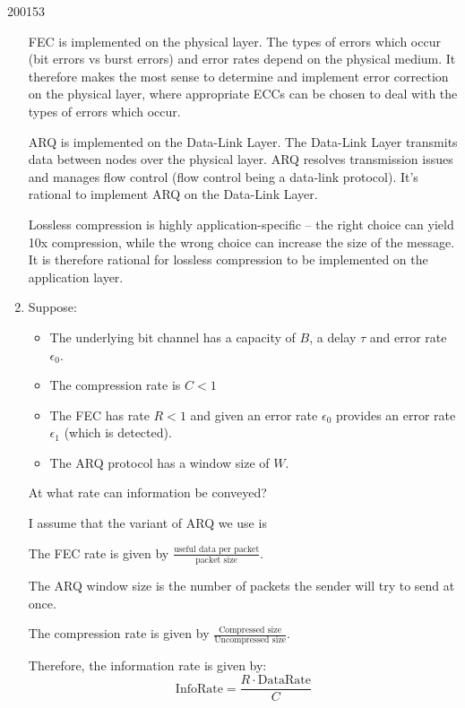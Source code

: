 \documentclass[10pt,\jkfside,a4paper]{article}
\begin{document}
\begin{examquestion}{2001}{5}{3}
\begin{enumerate}
FEC is implemented on the physical layer. The types of errors which occur
(bit errors vs burst errors) and error rates depend on the physical medium.
It therefore makes the most sense to determine and implement error
correction on the physical layer, where appropriate ECCs can be chosen to
deal with the types of errors which occur.

ARQ is implemented on the Data-Link Layer. The Data-Link Layer transmits
data between nodes over the physical layer. ARQ resolves transmission issues
and manages flow control (flow control being a data-link protocol). It's
rational to implement ARQ on the Data-Link Layer.

Lossless compression is highly application-specific -- the right choice can
yield 10x compression, while the wrong choice can increase the size of the
message. It is therefore rational for lossless compression to be implemented
on the application layer.

\item Suppose:

\begin{itemize}

\item The underlying bit channel has a capacity of $B$, a delay $\tau$ and
error rate $\epsilon_0$.

\item The compression rate is $C < 1$

\item The FEC has rate $R < 1$ and given an error rate $\epsilon_0$ provides
an error rate $\epsilon_1$ (which is detected).

\item The ARQ protocol has a window size of $W$.

\end{itemize}

At what rate can information be conveyed?

I assume that the variant of ARQ we use is

The FEC rate is given by $\frac{\text{useful data per packet}}{\text{packet
size}}$.

The ARQ window size is the number of packets the sender will try to send at
once.

The compression rate is given by $\frac{\text{Compressed
size}}{\text{Uncompressed size}}$.

Therefore, the information rate is given by:
\[
\text{InfoRate} = \frac{R \cdot \text{DataRate}}{C}
\]


\end{enumerate}
\end{examquestion}
\end{document}
